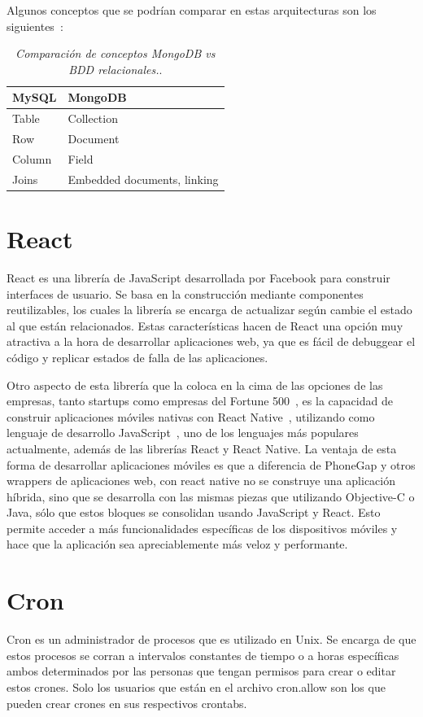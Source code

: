 Algunos conceptos que se podrían comparar en estas arquitecturas son los siguientes~\cite{MongoDBDocs}:
\begin{table}
    \centering
    \begin{tabular}{ | l | l |}
    \hline
	MySQL & MongoDB \\ \hline
	Table & Collection \\ \hline
	Row & Document \\ \hline
	Column & Field \\ \hline
	Joins & Embedded documents, linking \\ \hline
    \end{tabular}
    \caption{\textit{Comparación de conceptos MongoDB vs BDD relacionales.}.}
    \label{tab:mongo-compare}
\end{table}

\section{React} \label{react-section}
React es una librería de JavaScript desarrollada por Facebook para construir interfaces de usuario. Se basa en la construcción mediante componentes reutilizables, los cuales la librería se encarga de actualizar según cambie el estado al que están relacionados. Estas características hacen de React una opción muy atractiva a la hora de desarrollar aplicaciones web, ya que es fácil de debuggear el código y replicar estados de falla de las aplicaciones.

Otro aspecto de esta librería que la coloca en la cima de las opciones de las empresas, tanto startups como empresas del Fortune 500~\cite{reactjs}, es la capacidad de construir aplicaciones móviles nativas con React Native~\cite{reactnative}, utilizando como lenguaje de desarrollo JavaScript~\cite{js}, uno de los lenguajes más populares actualmente, además de las librerías React y React Native.
La ventaja de esta forma de desarrollar aplicaciones móviles es que a diferencia de PhoneGap y otros wrappers de aplicaciones web, con react native no se construye una aplicación híbrida, sino que se desarrolla con las mismas piezas que utilizando Objective-C o Java, sólo que estos bloques se consolidan usando JavaScript y React.
Esto permite acceder a más funcionalidades específicas de los dispositivos móviles y hace que la aplicación sea apreciablemente más veloz y performante.

\section{Cron}
Cron es un administrador de procesos que es utilizado en Unix. Se encarga de que estos procesos se corran a intervalos constantes de tiempo o a horas específicas ambos determinados por las personas que tengan permisos para crear o editar estos crones. Solo los usuarios que están en el archivo cron.allow son los que pueden crear crones en sus respectivos crontabs. 

